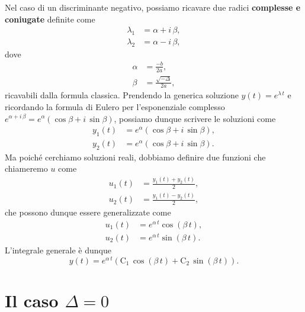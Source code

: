 \documentclass[../../analisi2]{subfiles}
\begin{document}
            Nel caso di un discriminante negativo, possiamo ricavare due radici \textbf{complesse e coniugate} definite come
            \begin{align*}
                \lambda_1 &= \alpha + i \, \beta,\\
                \lambda_2 &= \alpha - i \, \beta,
            \end{align*}
            dove
            \begin{align*}
                \alpha &= \frac{-b}{2a},\\
                \beta &= \frac{\sqrt{-\Delta}}{2a},
            \end{align*}
            ricavabili dalla formula classica. Prendendo la generica soluzione \(y(t) = e^{\lambda \, t}\) e ricordando la formula
            di Eulero per l'esponenziale complesso \(e^{\alpha + i \, \beta} = e^{\alpha} (\cos \beta + i \, \sin \beta)\), possiamo
            dunque scrivere le soluzioni come
            \begin{align*}
                y_1(t) &= e^{\alpha} (\cos \beta + i \, \sin \beta),\\
                y_2(t) &= e^{\alpha} (\cos \beta + i \, \sin \beta).
            \end{align*}
            Ma poiché cerchiamo soluzioni reali, dobbiamo definire due funzioni che chiameremo \(u\) come
            \begin{align*}
                u_1(t) &= \frac{y_1(t) + y_2(t)}{2},\\
                u_2(t) &= \frac{y_1(t) - y_2(t)}{2},
            \end{align*}
            che possono dunque essere generalizzate come
            \begin{align*}
                u_1(t) &= e^{\alpha \, t} \cos(\beta \, t),\\
                u_2(t) &= e^{\alpha \, t} \sin(\beta \, t).
            \end{align*}
            L'integrale generale è dunque
            \[
                y(t) = e^{\alpha \, t} \left(\mathrm{C_1} \, \cos(\beta \, t) + \mathrm{C_2} \, \sin(\beta \, t)\right).
            \]

        \section{Il caso \texorpdfstring{\(\Delta = 0\)}{discriminante uguale a zero}}
\end{document}
